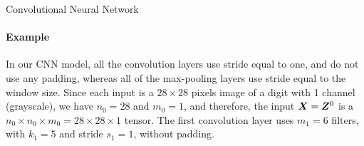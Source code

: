 \begin{frame}{Convolutional Neural Network}
\framesubtitle{Example}

\vspace*{-0.5cm}

    In our CNN model, all the convolution layers use stride equal to one,
    and do not use any padding, whereas all of the max-pooling layers
    use stride equal to the window size.
    Since each input is a
    $28 \times 28$ pixels image of a digit with 1 channel (grayscale),
    we have $n_0=28$ and $m_0=1$, and therefore, the
    input ${\boldsymbol X} = {\boldsymbol Z}^0$ is a $n_0 \times n_0 \times m_0 = 28 \times 28
    \times 1$ tensor. 
    The first convolution
    layer uses $m_1=6$ filters, with $k_1=5$ and stride $s_1=1$, without padding. 

    \medskip


\end{frame}
